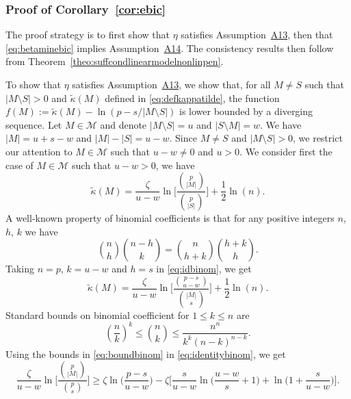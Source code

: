 \documentclass[bj,authoryear]{imsart}
\theoremstyle{plain}
\newcommand{\M}{\mathcal{M}}
\begin{document}
\subsubsection{Proof of Corollary~\ref{cor:ebic}}
The proof strategy is to first show that $\eta$ satisfies Assumption~\hyperlink{lab:A13}{A13}, then that \eqref{eq:betaminebic} implies Assumption~\hyperlink{lab:A14}{A14}. The consistency results then follow from Theorem~\ref{theo:suffcondlinearmodelnonlinpen}.

To show that $\eta$ satisfies Assumption~\hyperlink{lab:A13}{A13}, we show that, for all $M\neq S$ such that $|M\setminus S|>0$ and $\tilde{\kappa}(M)$ defined in \eqref{eq:defkappatilde}, the function $f(M):=\tilde{\kappa}(M)-\ln(p-s/|M\setminus S|)$ is lower bounded by a diverging sequence. Let $M\in\M$ and denote $|M\setminus S|=u$ and $|S\setminus M|=w$. We have $|M|=u+s-w$ and $|M|-|S|=u-w$. Since $M\neq S$ and $|M\setminus S|>0$, we restrict our attention to $M\in\mathcal{M}$ such that $u- w\neq0$ and $u>0$. We consider first the case of $M\in\mathcal{M}$ such that $u-w>0$, we have
    \begin{equation*}
        \tilde{\kappa}(M)=\frac{\zeta}{u-w}\ln\bigg[\frac{\binom{p}{|M|}}{\binom{p}{|S|}}\bigg]+ \frac{1}{2}\ln(n).
    \end{equation*}
    A well-known property of binomial coefficients is that for any positive integers $n$, $h$, $k$ we have
    \begin{equation}\label{eq:idbinom}
        \binom{n}{h}\binom{n-h}{k}=\binom{n}{h+k}\binom{h+k}{h}.
    \end{equation}
    Taking $n=p$, $k=u-w$ and $h=s$ in \eqref{eq:idbinom}, we get
    \begin{equation}\label{eq:identitybinom}
        \tilde{\kappa}(M)=\frac{\zeta}{u-w}\ln\bigg[\frac{\binom{p -s}{u-w}}{\binom{|M|}{s}}\bigg]+ \frac{1}{2}\ln(n).
    \end{equation}
Standard bounds on binomial coefficient for $1\leq k\leq n$ are
\begin{equation}\label{eq:boundbinom}
  \left(\frac{n}{k}\right)^k \leq  \binom{n}{k} \leq \frac{n^n}{k^k(n-k)^{n-k}}.
\end{equation}
Using the bounds in \eqref{eq:boundbinom} in \eqref{eq:identitybinom}, we get
\begin{equation}\label{eq:gggg}
    \frac{\zeta}{u-w}\ln\bigg[\frac{\binom{p}{|M|}}{\binom{p}{s}}\bigg] \geq \zeta\ln\bigg(\frac{p-s}{u-w}\bigg)-\zeta\bigg[\frac{s}{u-w}\ln\bigg(\frac{u-w}{s}+1\bigg) +\ln\bigg(1+\frac{s}{u-w}\bigg) \bigg].
\end{equation}
\end{document}
